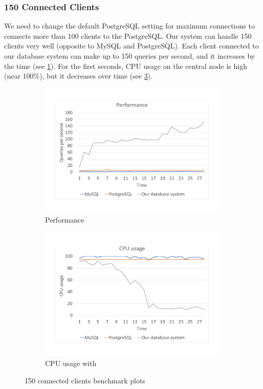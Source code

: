 \subsubsection*{150 Connected Clients}
We need to change the default PostgreSQL setting for maximum connections to connects more than 100 clients to the PostgreSQL. Our system can handle 150 clients very well (opposite to MySQL and PostgreSQL). Each client connected to our database system can make up to 150 queries per second, and it increases by the time (see \ref{bench150per}). For the first seconds, CPU usage on the central node is high (near 100\%), but it decreases over time (see \ref{bench150cpu}).

\begin{figure}[h]
    \begin{subfigure}{.5\textwidth}
        \centering
        \includegraphics[trim={1.78cm 2cm 2.08cm 1cm},clip,width=1.0\linewidth]{excel/150per.pdf}
        \caption{Performance}
        \label{bench150per}
    \end{subfigure}
    \begin{subfigure}{.5\textwidth}
        \centering
        \includegraphics[trim={1.78cm 2cm 2.08cm 1cm},clip,width=1.0\linewidth]{excel/150cpu.pdf}
        \caption{CPU usage with}
        \label{bench150cpu}
    \end{subfigure}
    \caption{150 connected clients benchmark plots}
\end{figure}

